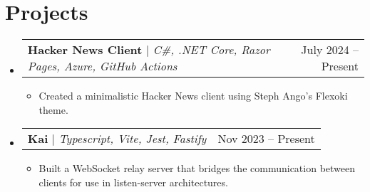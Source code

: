 \documentclass[letterpaper,11pt]{article}
\makeatletter
\newcommand{\resumeItem}[1]{
  \item\small{#1}
}
\newcommand{\resumeProjectHeading}[2]{
    \item
    \begin{tabular*}{0.97\textwidth}{l@{\extracolsep{\fill}}r}
      \small#1 & #2 \\
    \end{tabular*}\vspace{-7pt}
}
\newcommand{\resumeSubHeadingListStart}{\begin{itemize}[leftmargin=0.15in, label={}]}
\newcommand{\resumeSubHeadingListEnd}{\end{itemize}}
\newcommand{\resumeItemListStart}{\begin{itemize}}
\newcommand{\resumeItemListEnd}{\end{itemize}}
\makeatother
\begin{document}
\section{Projects}
    \resumeSubHeadingListStart
      \resumeProjectHeading
          {\textbf{Hacker News Client} $|$ \emph{C\#, .NET Core, Razor Pages, Azure, GitHub Actions}}{July 2024 -- Present}
          \resumeItemListStart
            \resumeItem{Created a minimalistic Hacker News client using Steph Ango's Flexoki theme.}
          \resumeItemListEnd
      \resumeProjectHeading
          {\textbf{Kai} $|$ \emph{Typescript, Vite, Jest, Fastify }}{Nov 2023 -- Present}
          \resumeItemListStart
            \resumeItem{Built a WebSocket relay server that bridges the communication between clients for use in listen-server architectures.}
          \resumeItemListEnd
    \resumeSubHeadingListEnd
\end{document}
